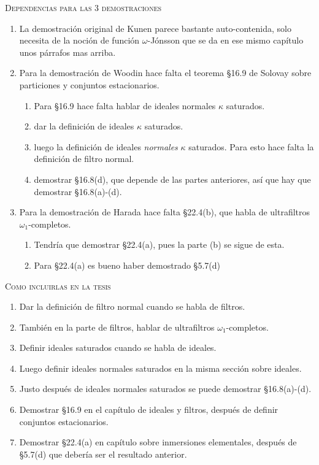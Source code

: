 \documentclass[12pt]{article}
\begin{document}
\textsc{Dependencias para las 3 demostraciones}

\begin{enumerate}
  \item La demostración original de Kunen parece bastante auto-contenida,
    solo necesita de la noción de función $\omega$-Jónsson que se da en ese
    mismo capítulo unos párrafos mas arriba.
  \item Para la demostración de Woodin hace falta el teorema \S16.9 de Solovay sobre
    particiones y conjuntos estacionarios.
    \begin{enumerate}
      \item Para \S16.9 hace falta hablar de ideales normales $\kappa$ saturados.
      \item dar la definición de ideales $\kappa$ saturados.
      \item luego la definición de ideales \emph{normales} $\kappa$ saturados.
        Para esto hace falta la definición de filtro normal.
      \item demostrar \S16.8(d), que depende de las partes anteriores,
        así que hay que demostrar \S16.8(a)-(d).
    \end{enumerate}
  \item Para la demostración de Harada hace falta \S22.4(b), que habla de
    ultrafiltros $\omega_1$-completos.
    \begin{enumerate}
      \item Tendría que demostrar \S22.4(a), pues la parte (b) se sigue de esta.
      \item Para \S22.4(a) es bueno haber demostrado \S5.7(d)
    \end{enumerate}
\end{enumerate}

\textsc{Como incluirlas en la tesis}

\begin{enumerate}
  \item Dar la definición de filtro normal cuando se habla de filtros.
  \item También en la parte de filtros, hablar de ultrafiltros $\omega_1$-completos.
  \item Definir ideales saturados cuando se habla de ideales.
  \item Luego definir ideales normales saturados en la misma sección sobre ideales.
  \item Justo después de ideales normales saturados se puede demostrar \S16.8(a)-(d).
  \item Demostrar \S16.9 en el capítulo de ideales y filtros, después de definir
    conjuntos estacionarios.
  \item Demostrar \S22.4(a) en capítulo sobre inmersiones elementales,
    después de \S5.7(d) que debería ser el resultado anterior.
\end{enumerate}
\end{document}
